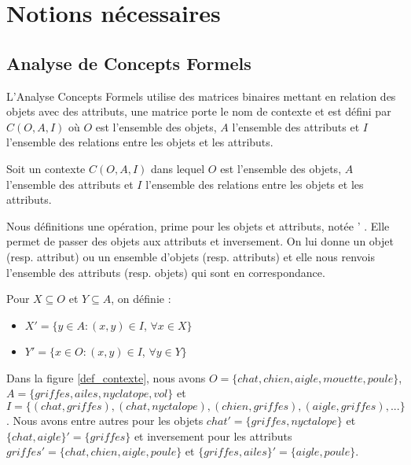 \chapter{Notions nécessaires}

\section{Analyse de Concepts Formels}

L'Analyse Concepts Formels utilise des matrices binaires mettant en relation des objets avec des attributs, une matrice porte le nom de contexte et est défini par $C(O, A, I)$ où $O$ est l'ensemble des objets, $A$ l'ensemble des attributs et $I$ l'ensemble des relations entre les objets et les attributs.

\begin{definition}[Contexte]
Soit un contexte $C(O, A, I)$ dans lequel $O$ est l'ensemble des objets, $A$ l'ensemble des attributs et $I$ l'ensemble des relations entre les objets et les attributs.
\end{definition}

Nous définitions une opération, \guillemotleft{} prime \guillemotright{} pour les objets et attributs, notée \guillemotleft{} ' \guillemotright{}. Elle permet de passer des objets aux attributs et inversement. On lui donne un objet (resp. attribut) ou un ensemble d'objets (resp. attributs) et elle nous renvois l'ensemble des attributs (resp. objets) qui sont en correspondance.

\begin{definition}
Pour $X \subseteq O$ et $Y \subseteq A$, on définie :
\begin{itemize}
	\item $X' = \{y \in A : (x, y) \in I$, $\forall x \in X\}$
	\item $Y' = \{x \in O : (x, y) \in I$, $\forall y \in Y\}$
\end{itemize}
\end{definition}

Dans la figure \ref{def_contexte}, nous avons $O = \{chat, chien, aigle, mouette, poule\}$, $A = \{griffes, ailes, nyclatope, vol\}$ et $I = \{(chat, griffes), (chat, nyctalope), (chien, griffes), (aigle, griffes), ...\}$. Nous avons entre autres pour les objets $chat' = \{griffes, nyctalope\}$ et $\{chat, aigle\}' = \{griffes\}$ et inversement pour les attributs $griffes' = \{chat, chien, aigle, poule\}$ et $\{griffes, ailes\}' = \{aigle, poule\}$.

